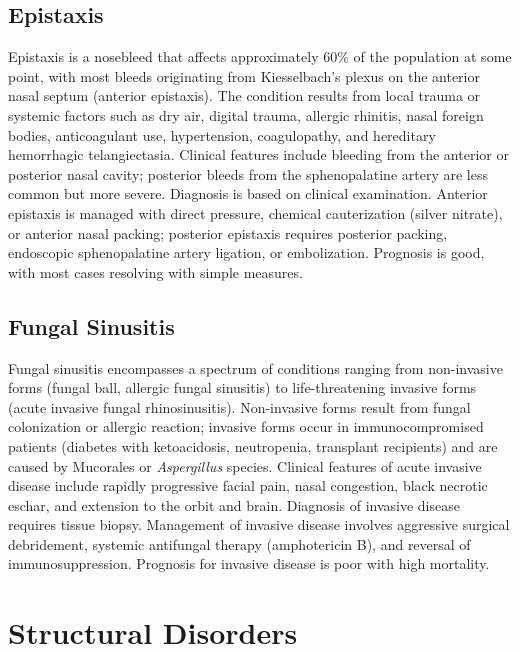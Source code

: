 \subsection{Epistaxis}
\label{sec:Epistaxis}
Epistaxis is a nosebleed that affects approximately 60\% of the population at some point, with most bleeds originating from Kiesselbach's plexus on the anterior nasal septum (anterior epistaxis). The condition results from local trauma or systemic factors such as dry air, digital trauma, allergic rhinitis, nasal foreign bodies, anticoagulant use, hypertension, coagulopathy, and hereditary hemorrhagic telangiectasia. Clinical features include bleeding from the anterior or posterior nasal cavity; posterior bleeds from the sphenopalatine artery are less common but more severe. Diagnosis is based on clinical examination. Anterior epistaxis is managed with direct pressure, chemical cauterization (silver nitrate), or anterior nasal packing; posterior epistaxis requires posterior packing, endoscopic sphenopalatine artery ligation, or embolization. Prognosis is good, with most cases resolving with simple measures.

\subsection{Fungal Sinusitis}
\label{sec:Fungal Sinusitis}
Fungal sinusitis encompasses a spectrum of conditions ranging from non-invasive forms (fungal ball, allergic fungal sinusitis) to life-threatening invasive forms (acute invasive fungal rhinosinusitis). Non-invasive forms result from fungal colonization or allergic reaction; invasive forms occur in immunocompromised patients (diabetes with ketoacidosis, neutropenia, transplant recipients) and are caused by Mucorales or \textit{Aspergillus} species. Clinical features of acute invasive disease include rapidly progressive facial pain, nasal congestion, black necrotic eschar, and extension to the orbit and brain. Diagnosis of invasive disease requires tissue biopsy. Management of invasive disease involves aggressive surgical debridement, systemic antifungal therapy (amphotericin B), and reversal of immunosuppression. Prognosis for invasive disease is poor with high mortality.

\section{Structural Disorders}

